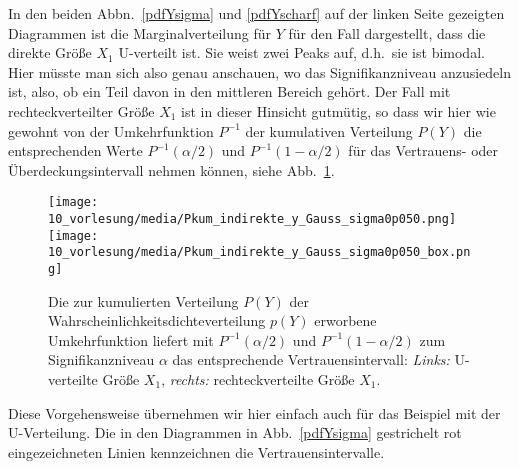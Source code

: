 In den beiden Abbn.~\ref{pdfYsigma} und \ref{pdfYscharf} auf der linken Seite gezeigten
Diagrammen ist die Marginalverteilung für $Y$ für den Fall dargestellt, dass die direkte Größe
$X_1$ U-verteilt ist. Sie weist zwei Peaks auf, d.h.\ sie ist bimodal.
Hier müsste man sich also genau anschauen, wo das Signifikanzniveau anzusiedeln ist, also, ob ein
Teil davon in den mittleren Bereich gehört. Der Fall mit rechteckverteilter Größe $X_1$ ist
in dieser Hinsicht gutmütig, so dass wir hier wie gewohnt von der Umkehrfunktion $P^{-1}$ der kumulativen
Verteilung $P(Y)$ die entsprechenden Werte $P^{-1}(\alpha/2)$ und $P^{-1}(1-\alpha/2)$ für
das Vertrauens- oder Überdeckungsintervall nehmen können,
siehe Abb.~\ref{PkumY}.
\begin{figure}
	\begin{center}
	\texttt{[image: 10\_vorlesung/media/Pkum\_indirekte\_y\_Gauss\_sigma0p050.png]}
		\hspace{2mm}
	\texttt{[image: 10\_vorlesung/media/Pkum\_indirekte\_y\_Gauss\_sigma0p050\_box.png]}
		\caption{Die zur kumulierten Verteilung $P(Y)$ der Wahrscheinlichkeitsdichteverteilung $p(Y)$
			erworbene Umkehrfunktion liefert mit $P^{-1}(\alpha/2)$ und $P^{-1}(1-\alpha/2)$ zum
			Signifikanzniveau $\alpha$ das entsprechende Vertrauensintervall:
			\textsl{Links:} U-verteilte Größe $X_1$,
			\textsl{rechts:} rechteckverteilte Größe $X_1$.}
		\label{PkumY}
	\end{center}
\end{figure}
Diese Vorgehensweise übernehmen wir hier einfach auch für das Beispiel mit der U-Verteilung. Die in den Diagrammen in Abb.~\ref{pdfYsigma} gestrichelt rot
eingezeichneten Linien kennzeichnen die Vertrauensintervalle.

